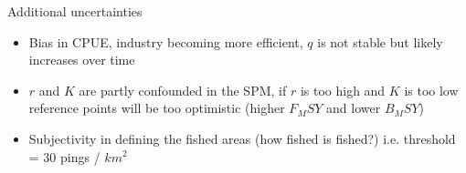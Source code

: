 \documentclass{beamer}
\begin{document}
\begin{frame}{Additional uncertainties}

\begin{itemize}
    \item Bias in CPUE, industry becoming more efficient, $q$ is not stable but likely increases over time
    \item $r$ and $K$ are partly confounded in the SPM, if $r$ is too high and $K$ is too low reference points will be too optimistic (higher $F_MSY$ and lower $B_MSY$)
    \item Subjectivity in defining the fished areas (how fished is fished?) i.e. threshold = 30 pings / \(km^2\)
\end{itemize}

\end{frame}
 
%
%
\end{document}
